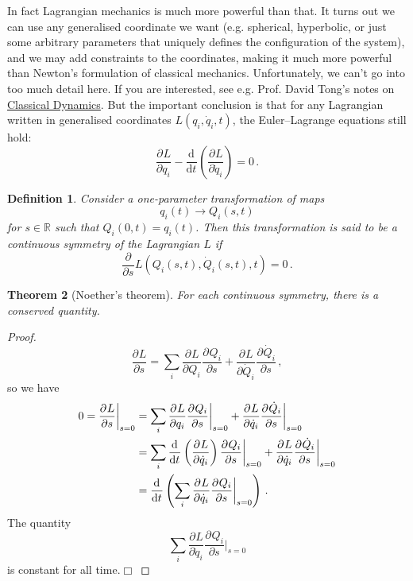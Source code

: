 \documentclass{article}
\theoremstyle{plain}\theoremheaderfont{\normalfont\itshape}\theorembodyfont{\rmfamily}\theoremseparator{.}\newtheorem*{rem}{Remark}\newtheorem*{ex}{Example}\newtheorem*{proof}{Proof}\newtheorem*{altp}{Alternative proof}
\theoremstyle{plain}\theoremheaderfont{\normalfont\bfseries}\theorembodyfont{\rmfamily}\theoremseparator{.}\newtheorem{thm}{Theorem}[section]\newtheorem{lem}[thm]{Lemma}\newtheorem{prop}[thm]{Proposition}\newtheorem*{cor}{Corollary}\newtheorem{defn}[thm]{Definition}\newtheorem{clm}[thm]{Claim}\newtheorem{clminproof}{Claim}\newtheorem*{law}{Law}\newtheorem{pos}[thm]{Postulate}
\theoremstyle{break}\theoremheaderfont{\normalfont\itshape}\theorembodyfont{\rmfamily}\theoremseparator{.\medskip}\newtheorem*{proofskip}{Proof}\newtheorem*{exs}{Examples}\newtheorem*{rems}{Remarks}
\theoremstyle{break}\theoremheaderfont{\normalfont\bfseries}\theorembodyfont{\rmfamily}\theoremseparator{.\medskip}\newtheorem{lemskip}[thm]{Lemma}\newtheorem{defnskip}[thm]{Definition}\newtheorem{propskip}[thm]{Proposition}\newtheorem{thmskip}[thm]{Theorem}
\numberwithin{equation}{section}
\newcommand{\qed}{\hfill\ensuremath{\Box}}
\newcommand{\dv}[3][]{\frac{\mathrm{d}^{#1} #2}{{\mathrm{d} #3}^{#1}}}
\newcommand{\pdv}[3][]{\frac{\partial^{#1} #2}{{\partial #3}^{#1}}}
\newcommand{\RR}{\mathbb{R}}
\begin{document}
    In fact Lagrangian mechanics is much more powerful than that. It turns out we can use any generalised coordinate we want (e.g. spherical, hyperbolic, or just some arbitrary parameters that uniquely defines the configuration of the system), and we may add constraints to the coordinates, making it much more powerful than Newton's formulation of classical mechanics. Unfortunately, we can't go into too much detail here. If you are interested, see e.g. Prof. David Tong's notes on \href{https://www.damtp.cam.ac.uk/user/tong/dynamics.html}{Classical Dynamics}. But the important conclusion is that for any Lagrangian written in generalised coordinates \(L(q_i,\dot{q}_i,t)\), the Euler--Lagrange equations still hold:
    \begin{equation}
        \pdv{L}{q_i}-\dv{}{t}\left(\pdv{L}{\dot{q}_i}\right)=0\,.
    \end{equation}

    \begin{defn}
        Consider a one-parameter transformation of maps
        \begin{equation}
            q_i(t)\longrightarrow Q_i(s,t)
        \end{equation}
        for \(s\in\RR\) such that \(Q_i(0,t)=q_i(t)\). Then this transformation is said to be a \textit{continuous symmetry} of the Lagrangian \(L\) if
        \begin{equation}
            \pdv{}{s}L(Q_i(s,t),\dot{Q}_i(s,t),t)=0\,.
        \end{equation}
    \end{defn}
    \begin{thm}[Noether's theorem]
        For each continuous symmetry, there is a conserved quantity.
    \end{thm}
    \begin{proof}
        \begin{equation}
            \pdv{L}{s}=\sum_i \pdv{L}{Q_i}\pdv{Q_i}{s}+\pdv{L}{\dot{Q}_i}\pdv{\dot{Q}_i}{s}\,,
        \end{equation}
        so we have
        \begin{align}
            0=\pdv{L}{s}\bigg|_{s=0}&=\sum_i\pdv{L}{q_i}\pdv{Q_i}{s}\bigg|_{s=0}+\pdv{L}{\dot{q}_i}\pdv{\dot{Q}_i}{s}\bigg|_{s=0}\notag\\
            &=\sum_i\dv{}{t}\left(\pdv{L}{\dot{q}_i}\right)\pdv{Q_i}{s}\bigg|_{s=0}+\pdv{L}{\dot{q}_i}\pdv{\dot{Q}_i}{s}\bigg|_{s=0}\notag \\
            &=\dv{}{t}\left(\sum_i\pdv{L}{\dot{q}_i}\pdv{Q_i}{s}\bigg|_{s=0}\right)\,.
        \end{align}
        The quantity
        \begin{equation}
            \sum_i\pdv{L}{\dot{q}_i}\pdv{Q_i}{s}\bigg|_{s=0}
        \end{equation}
        is constant for all time.\qed
    \end{proof}
\end{document}
